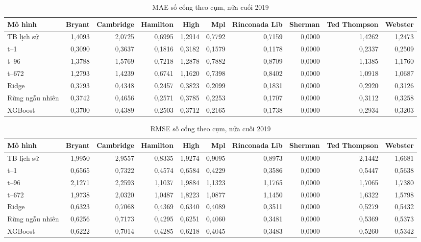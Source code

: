 \documentclass[conference,a4paper]{IEEEtran}
\begin{document}
\begin{table}[!t]
\caption{MAE số cổng theo cụm, nửa cuối 2019}
\label{tab:test_occupancy_ports_MAE}
\centering\footnotesize
\setlength{\tabcolsep}{3pt}
\begin{tabularx}{\textwidth}{@{}Xrrrrrrrrr@{}}
\toprule
\textbf{Mô hình} & \textbf{Bryant} & \textbf{Cambridge} & \textbf{Hamilton} & \textbf{High} & \textbf{Mpl} & \textbf{Rinconada Lib} & \textbf{Sherman} & \textbf{Ted Thompson} & \textbf{Webster} \\
\midrule
TB lịch sử & 1,4093 & 2,0725 & 0,6995 & 1,2914 & 0,7792 & 0,7159 & 0,0000 & 1,4262 & 1,2473 \\
t–1 & 0,3090 & 0,3637 & 0,1816 & 0,3182 & 0,1579 & 0,1178 & 0,0000 & 0,2337 & 0,2509 \\
t–96 & 1,3788 & 1,5769 & 0,7218 & 1,2878 & 0,7882 & 0,8709 & 0,0000 & 1,1385 & 1,1760 \\
t–672 & 1,2793 & 1,4239 & 0,6741 & 1,1620 & 0,7398 & 0,8402 & 0,0000 & 1,0918 & 1,0687 \\
Ridge & 0,3793 & 0,4348 & 0,2457 & 0,3823 & 0,2099 & 0,1831 & 0,0000 & 0,2920 & 0,3126 \\
Rừng ngẫu nhiên & 0,3742 & 0,4656 & 0,2571 & 0,3785 & 0,2253 & 0,1707 & 0,0000 & 0,3112 & 0,3258 \\
XGBoost & 0,3700 & 0,4389 & 0,2503 & 0,3712 & 0,2165 & 0,1738 & 0,0000 & 0,2934 & 0,3203 \\
\bottomrule
\end{tabularx}
\end{table}

\begin{table}[!t]
\caption{RMSE số cổng theo cụm, nửa cuối 2019}
\label{tab:test_occupancy_ports_RMSE}
\centering\footnotesize
\setlength{\tabcolsep}{3pt}
\begin{tabularx}{\textwidth}{@{}Xrrrrrrrrr@{}}
\toprule
\textbf{Mô hình} & \textbf{Bryant} & \textbf{Cambridge} & \textbf{Hamilton} & \textbf{High} & \textbf{Mpl} & \textbf{Rinconada Lib} & \textbf{Sherman} & \textbf{Ted Thompson} & \textbf{Webster} \\
\midrule
TB lịch sử & 1,9950 & 2,9557 & 0,8335 & 1,9274 & 0,9095 & 0,8973 & 0,0000 & 2,1442 & 1,6681 \\
t–1 & 0,6565 & 0,7322 & 0,4574 & 0,6584 & 0,4229 & 0,3586 & 0,0000 & 0,5447 & 0,5638 \\
t–96 & 2,1271 & 2,2593 & 1,1037 & 1,9884 & 1,1323 & 1,1765 & 0,0000 & 1,7065 & 1,7380 \\
t–672 & 1,9738 & 2,0320 & 1,0487 & 1,8223 & 1,0877 & 1,1450 & 0,0000 & 1,6322 & 1,5798 \\
Ridge & 0,6323 & 0,7068 & 0,4369 & 0,6340 & 0,4089 & 0,3511 & 0,0000 & 0,5279 & 0,5432 \\
Rừng ngẫu nhiên & 0,6256 & 0,7173 & 0,4295 & 0,6251 & 0,4060 & 0,3481 & 0,0000 & 0,5369 & 0,5373 \\
XGBoost & 0,6222 & 0,7014 & 0,4285 & 0,6218 & 0,4045 & 0,3483 & 0,0000 & 0,5260 & 0,5342 \\
\bottomrule
\end{tabularx}
\end{table}
\end{document}
